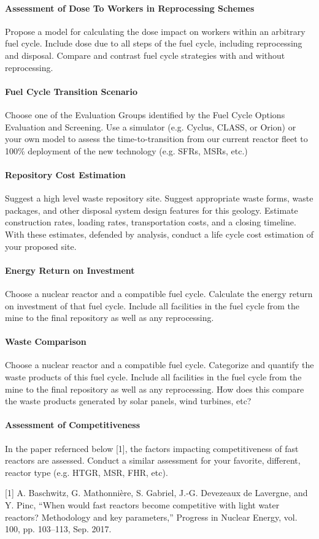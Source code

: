 \documentclass[12pts, answers]{exam}
\begin{document}
\paragraph{Assessment of Dose To Workers in Reprocessing Schemes} Propose a model for
calculating the dose impact on workers within an arbitrary fuel cycle. Include
dose due to all steps of the fuel cycle, including reprocessing and disposal.
Compare and contrast fuel cycle strategies with and without reprocessing.

\paragraph{Fuel Cycle Transition Scenario} Choose one of the Evaluation Groups
identified by the Fuel Cycle Options Evaluation and Screening. Use a simulator
(e.g. Cyclus, CLASS, or Orion) or your own model to assess the
time-to-transition from our current reactor fleet to 100\% deployment of the
new technology (e.g. SFRs, MSRs, etc.)

\paragraph{Repository Cost Estimation} Suggest a high level waste repository
site. Suggest appropriate waste forms, waste packages, and other disposal
system design features for this geology. Estimate construction rates, loading
rates, transportation costs, and a closing timeline. With these estimates,
defended by analysis, conduct a life cycle cost estimation of your proposed
site.

\paragraph{Energy Return on Investment} Choose a nuclear reactor and a
compatible fuel cycle. Calculate the energy return on investment of that fuel
cycle. Include all facilities in the fuel cycle from the mine to the final
repository as well as any reprocessing.

\paragraph{Waste Comparison} Choose a nuclear reactor and a
compatible fuel cycle. Categorize and quantify the waste products of this fuel cycle.
Include all facilities in the fuel cycle from the mine to the final
repository as well as any reprocessing. How does this compare the waste
products generated by solar panels, wind turbines, etc?



\paragraph{Assessment of Competitiveness}
In the paper refernced below [1], the factors impacting competitiveness of fast
reactors are assessed. Conduct a similar assessment for your favorite,
different, reactor type (e.g. HTGR, MSR, FHR, etc).

[1] A. Baschwitz, G. Mathonnière, S. Gabriel, J.-G. Devezeaux de Lavergne, and
Y. Pinc, “When would fast reactors become competitive with light water
reactors? Methodology and key parameters,” Progress in Nuclear Energy, vol.
100, pp. 103–113, Sep. 2017.
\end{document}
